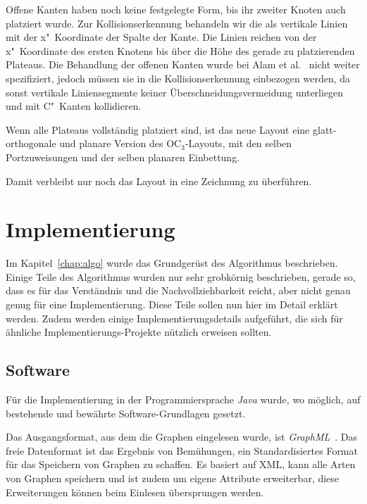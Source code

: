 \documentclass[a4paper]{scrreprt}
\theoremstyle{definition}
\begin{document}
Offene Kanten haben noch keine festgelegte Form, bis ihr zweiter Knoten auch platziert wurde. Zur Kollisionserkennung behandeln wir die als vertikale Linien mit der x"~Koordinate der Spalte der Kante. Die Linien reichen von der x"~Koordinate des ersten Knotens bis über die Höhe des gerade zu platzierenden Plateaus. Die Behandlung der offenen Kanten wurde bei Alam et al.~\cite{smooth-13} nicht weiter spezifiziert, jedoch müssen sie in die Kollisionserkennung einbezogen werden, da sonst vertikale Liniensegmente keiner Überschneidungsvermeidung unterliegen und mit C"~Kanten kollidieren.

Wenn alle Plateaus vollständig platziert sind, ist das neue Layout eine glatt-orthogonale und planare Version des OC$_3$-Layouts, mit den selben Portzuweisungen und der selben planaren Einbettung.

Damit verbleibt nur noch das Layout in eine Zeichnung zu überführen. 



\chapter{Implementierung}
\label{chap:impl}

Im Kapitel~\ref{chap:algo} wurde das Grundgerüst des Algorithmus beschrieben. Einige Teile des Algorithmus wurden nur sehr grobkörnig beschrieben, gerade so, dass es für das Verständnis und die Nachvollziehbarkeit reicht, aber nicht genau genug für eine Implementierung. Diese Teile sollen nun hier im Detail erklärt werden. Zudem werden einige Implementierungsdetails aufgeführt, die sich für ähnliche Implementierungs-Projekte nützlich erweisen sollten.

\section{Software}

Für die Implementierung in der Programmiersprache \emph{Java} wurde, wo möglich, auf bestehende und bewährte Software-Grundlagen gesetzt.

Das Ausgangsformat, aus dem die Graphen eingelesen wurde, ist \emph{GraphML}~\cite{brandes+al-14}. Das freie Datenformat ist das Ergebnis von Bemühungen, ein Standardisiertes Format für das Speichern von Graphen zu schaffen. Es basiert auf XML, kann alle Arten von Graphen speichern und ist zudem um eigene Attribute erweiterbar, diese Erweiterungen können beim Einlesen übersprungen werden.
\end{document}
